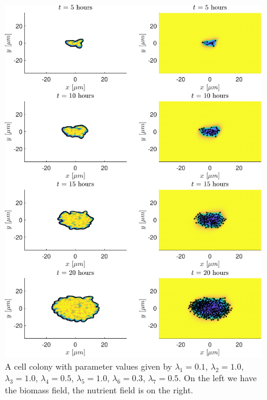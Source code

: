 \begin{figure}[h] %
    \centering
    \includegraphics[width= 1\textwidth]{
        chapter2/figures/t_all_L1_0o10_L2_1o00_L3_1o00_L4_0o50_L5_1o00_L6_0o30_L7_0o50.pdf}
    \caption{A cell colony with parameter values given by
             $\lambda_1 = 0.1$,  
             $\lambda_2 = 1.0$, 
             $\lambda_3 = 1.0$, 
             $\lambda_4 = 0.5$, 
             $\lambda_5 = 1.0$, 
             $\lambda_6 = 0.3$, 
             $\lambda_7 = 0.5$. 
             On the left we have the biomass field, the nutrient field is on the right.}
    \label{fig:ColonySimulationNutrientFieldN210}
    \end{figure}
    \filbreak


